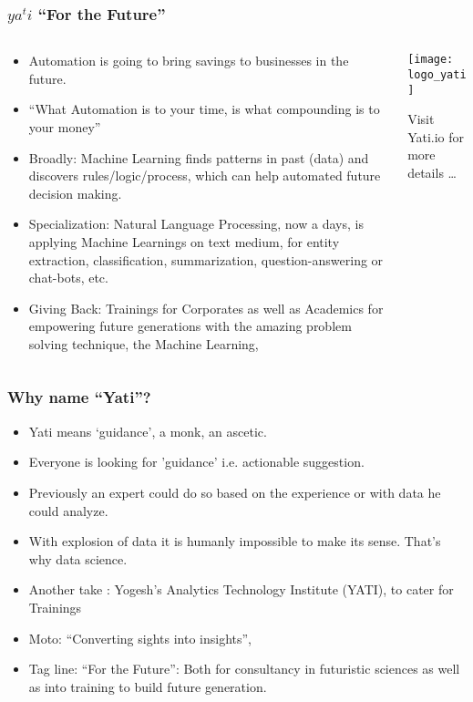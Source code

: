 \begin{frame}[fragile]\frametitle{$ya^ti$ ``For the Future''}

\begin{columns}
    \begin{column}[T]{0.6\linewidth}
      \begin{itemize}
		\item Automation is going to bring savings to businesses in the future.
		\item ``What Automation is to your time, is what compounding is to your money''
		\item Broadly: Machine Learning finds patterns in past (data) and discovers rules/logic/process, which can help automated future decision making.
		\item Specialization: Natural Language Processing, now a days, is applying Machine Learnings on text medium, for entity extraction, classification, summarization, question-answering or chat-bots, etc.
		\item Giving Back: Trainings for Corporates as well as Academics for empowering future generations with the amazing problem solving technique, the Machine Learning,
	  \end{itemize}

    \end{column}
    \begin{column}[T]{0.4\linewidth}
      \centering
      \texttt{[image: logo\_yati]}
	  
	  Visit Yati.io for more details \ldots

    \end{column}
  \end{columns}
  
\end{frame}

\begin{frame}[fragile]\frametitle{Why name ``Yati''?}
\begin{itemize}
\item Yati means `guidance', a monk, an ascetic.
\item Everyone is looking for 'guidance' i.e. actionable suggestion.
\item Previously an expert could do so based on the experience or with data he could analyze. 
\item With explosion of data it is humanly impossible to make its sense. That’s why data science.
\item Another take : Yogesh's Analytics Technology Institute (YATI), to cater for Trainings
\item Moto: “Converting sights into insights”, 
\item Tag line: ``For the Future'': Both for consultancy in futuristic sciences as well as into training to build future generation.
\end{itemize}
\end{frame}

